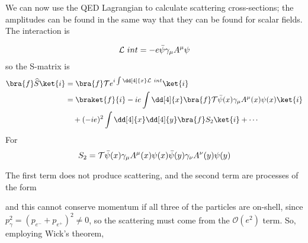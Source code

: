 We can now use the QED Lagrangian to calculate scattering
cross-sections; the amplitudes can be found in the same way that they
can be found for scalar fields. The interaction is

\begin{equation}
  \label{eq:126}
\mathcal{L}~{int} = - e \bar{\psi} \gamma_{\mu} A^{\mu} \psi
\end{equation}
so the S-matrix is
\begin{align*}
  \bra{f} \Op{S} \ket{i} &= \bra{f} \tOrd e^{i \int \dd[4]{x} \Lag~{int}} \ket{i} \\
&= \braket{f}{i} - ie \int \dd[4]{x} \bra{f} \tOrd \bar{\psi}(x) \gamma_{\mu} A^{\mu}(x) \psi(x) \ket{i} \\
& \quad + (-ie)^2 \int \dd[4]{x} \dd[4]{y} \bra{f} S_2 \ket{i} + \cdots
\end{align*}
For 
\[ S_2=  \mathcal{T} \bar{\psi}(x) \gamma_{\mu} A^{\mu}(x) \psi(x) \bar{\psi}(y) \gamma_{\nu} A^{\nu}(y) \psi(y) \]

The first term does not produce scattering, and the second term are
processes of the form
\begin{tfeynin}[0.6ex]
       
\end{tfeynin}
and this cannot conserve momentum if all three of the particles are
on-shell, since $p_{\gamma}^2 = (p_{e^-}+p_{e^+})^2 \neq 0$, so the
scattering must come from the $\mathcal{O}(e^2)$ term. So, employing
Wick's theorem,

